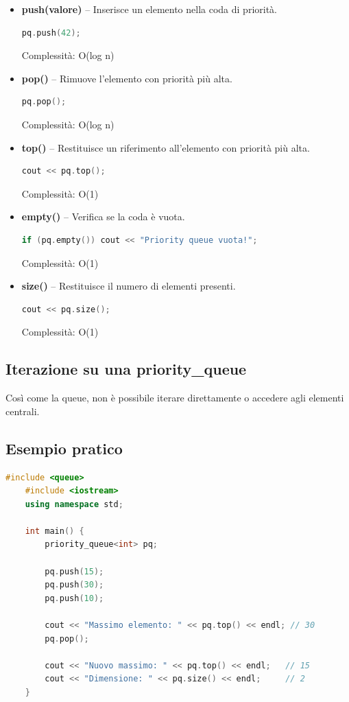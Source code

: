\begin{itemize}
	\item \textbf{push(valore)} – Inserisce un elemento nella coda di priorità.
	\begin{lstlisting}[language=C++]
		pq.push(42);
	\end{lstlisting}
	Complessità: O(log n)
	
	\item \textbf{pop()} – Rimuove l’elemento con priorità più alta.
	\begin{lstlisting}[language=C++]
		pq.pop();
	\end{lstlisting}
	Complessità: O(log n)
	
	\item \textbf{top()} – Restituisce un riferimento all’elemento con priorità più alta.
	\begin{lstlisting}[language=C++]
		cout << pq.top();
	\end{lstlisting}
	Complessità: O(1)
	
	\item \textbf{empty()} – Verifica se la coda è vuota.
	\begin{lstlisting}[language=C++]
		if (pq.empty()) cout << "Priority queue vuota!";
	\end{lstlisting}
	Complessità: O(1)
	
	\item \textbf{size()} – Restituisce il numero di elementi presenti.
	\begin{lstlisting}[language=C++]
		cout << pq.size();
	\end{lstlisting}
	Complessità: O(1)
\end{itemize}

\newpage
\subsection{Iterazione su una priority\_queue}
Così come la queue, non è possibile iterare direttamente o accedere agli elementi centrali.


\subsection{Esempio pratico}

\begin{lstlisting}[language=C++]
	#include <queue>
	#include <iostream>
	using namespace std;
	
	int main() {
		priority_queue<int> pq;
		
		pq.push(15);
		pq.push(30);
		pq.push(10);
		
		cout << "Massimo elemento: " << pq.top() << endl; // 30
		pq.pop();
		
		cout << "Nuovo massimo: " << pq.top() << endl;   // 15
		cout << "Dimensione: " << pq.size() << endl;     // 2
	}
\end{lstlisting}

